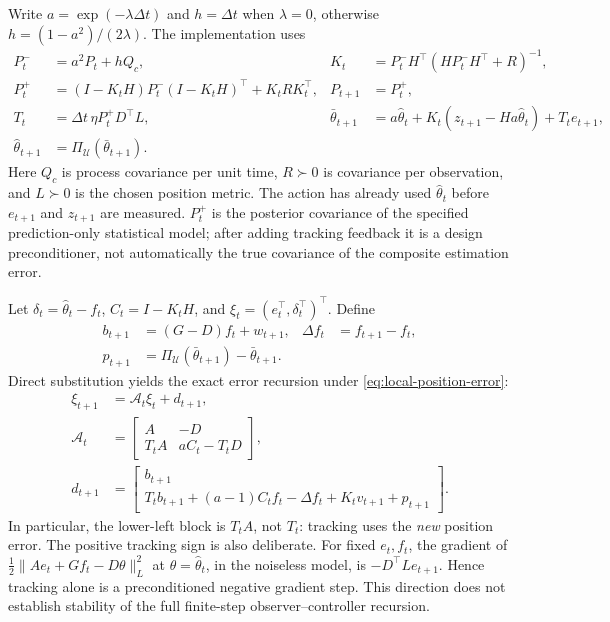 Write $a=\exp(-\lambda\Delta t)$ and
$h=\Delta t$ when $\lambda=0$, otherwise $h=(1-a^2)/(2\lambda)$.
The implementation uses
\begin{align}
P_t^-&=a^2P_t+hQ_c,
&K_t&=P_t^-H^\top(HP_t^-H^\top+R)^{-1},\\
P_t^+&=(I-K_tH)P_t^-(I-K_tH)^\top+K_tRK_t^\top,
&P_{t+1}&=P_t^+,\\
T_t&=\Delta t\,\eta P_t^+D^\top L,
&\bar\theta_{t+1}&=a\hat\theta_t+K_t(z_{t+1}-Ha\hat\theta_t)+T_te_{t+1},\\
\hat\theta_{t+1}&=\Pi_{\mathcal U}(\bar\theta_{t+1}).&&
\label{eq:appendix-composite-recursion}
\end{align}
Here $Q_c$ is process covariance per unit time, $R\succ0$ is covariance per
observation, and $L\succ0$ is the chosen position metric. The action has already
used $\hat\theta_t$ before $e_{t+1}$ and $z_{t+1}$ are measured. $P_t^+$ is the
posterior covariance of the specified prediction-only statistical model; after
adding tracking feedback it is a design preconditioner, not automatically the
true covariance of the composite estimation error.

Let $\delta_t=\hat\theta_t-f_t$, $C_t=I-K_tH$, and
$\xi_t=(e_t^\top,\delta_t^\top)^\top$. Define
\begin{align}
b_{t+1}&=(G-D)f_t+w_{t+1},
&\Delta f_t&=f_{t+1}-f_t,\\
p_{t+1}&=\Pi_{\mathcal U}(\bar\theta_{t+1})-\bar\theta_{t+1}.
\end{align}
Direct substitution yields the exact error recursion under
\eqref{eq:local-position-error}:
\begin{equation}\label{eq:composite-augmented}
\begin{aligned}
\xi_{t+1}&=\mathcal A_t\xi_t+d_{t+1},\\
\mathcal A_t&=
\begin{bmatrix}
A&-D\\
T_tA&aC_t-T_tD
\end{bmatrix},\\
d_{t+1}&=
\begin{bmatrix}
b_{t+1}\\
T_tb_{t+1}+(a-1)C_tf_t-\Delta f_t+K_tv_{t+1}+p_{t+1}
\end{bmatrix}.
\end{aligned}
\end{equation}
In particular, the lower-left block is $T_tA$, not $T_t$: tracking uses the
\emph{new} position error. The positive tracking sign is also deliberate. For
fixed $e_t,f_t$, the gradient of
$\frac12\|Ae_t+Gf_t-D\theta\|_L^2$ at $\theta=\hat\theta_t$, in the noiseless
model, is $-D^\top Le_{t+1}$. Hence tracking alone is a preconditioned negative
gradient step. This direction does not establish stability of the full finite-step
observer--controller recursion.

